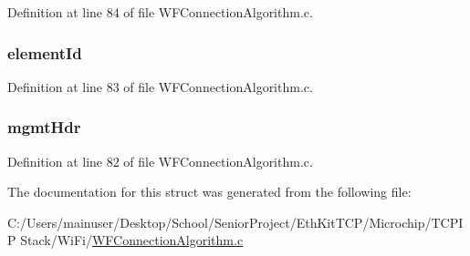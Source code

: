 Definition at line 84 of file W\+F\+Connection\+Algorithm.\+c.

\hypertarget{structca_element_response_struct_ae18351951739d45fe4aa49cb03e336c9}{}
\subsubsection[{element\+Id}]{ element\+Id}\label{structca_element_response_struct_ae18351951739d45fe4aa49cb03e336c9}


Definition at line 83 of file W\+F\+Connection\+Algorithm.\+c.

\hypertarget{structca_element_response_struct_a7267478e6419a759f2c5eaa97eaacab7}{}
\subsubsection[{mgmt\+Hdr}]{ mgmt\+Hdr}\label{structca_element_response_struct_a7267478e6419a759f2c5eaa97eaacab7}


Definition at line 82 of file W\+F\+Connection\+Algorithm.\+c.



The documentation for this struct was generated from the following file\+:\begin{DoxyCompactItemize}
\item 
C\+:/\+Users/mainuser/\+Desktop/\+School/\+Senior\+Project/\+Eth\+Kit\+T\+C\+P/\+Microchip/\+T\+C\+P\+I\+P Stack/\+Wi\+Fi/\hyperlink{_w_f_connection_algorithm_8c}{W\+F\+Connection\+Algorithm.\+c}\end{DoxyCompactItemize}
